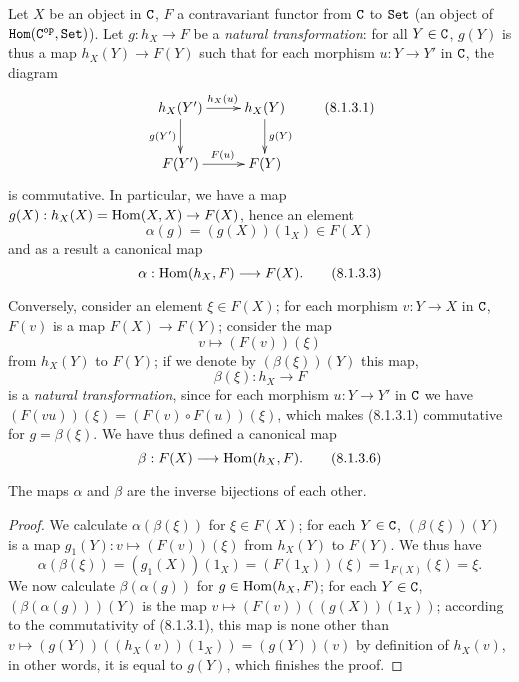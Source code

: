 \begin{env}[8.1.3]
\label{0.8.1.3}
Let $X$ be an object in $\mathtt{C}$, $F$ a contravariant functor from $\mathtt{C}$ to $\mathtt{Set}$
(an object of $\mathtt{Hom}(\mathtt{C}^\mathtt{op},\mathtt{Set})$). Let $g:h_X\to F$ be a \emph{natural transformation}: for all $Y\in\mathtt{C}$,
$g(Y)$ is thus a map $h_X(Y)\to F(Y)$ such that for each morphism $u:Y\to Y'$ in $\mathtt{C}$,
the diagram
\[
  \xymatrix{
    h_X(Y')\ar[r]^{h_X(u)}\ar[d]_{g(Y')} &
    h_X(Y)\ar[d]^{g(Y)}\\
    F(Y')\ar[r]^{F(u)} &
    F(Y)
  }
  \tag{8.1.3.1}
\]
is commutative. In particular, we have a map $g(X):h_X(X)=\Hom(X,X)\to F(X)$, hence an element
\[
  \alpha(g)=(g(X))(1_X)\in F(X)
  \tag{8.1.3.2}
\]
and as a result a canonical map
\[
  \alpha:\Hom(h_X,F)\to F(X).
  \tag{8.1.3.3}
\]

Conversely, consider an element $\xi\in F(X)$; for each morphism $v:Y\to X$ in $\mathtt{C}$, $F(v)$ is a
map $F(X)\to F(Y)$; consider the map
\[
  v\mapsto(F(v))(\xi)
  \tag{8.1.3.4}
\]
from $h_X(Y)$ to $F(Y)$; if we denote by $(\beta(\xi))(Y)$ this map,
\[
  \beta(\xi):h_X\to F
  \tag{8.1.3.5}
\]
is a \emph{natural transformation}, since for each morphism $u:Y\to Y'$ in $\mathtt{C}$ we have
$(F(vu))(\xi)=(F(v)\circ F(u))(\xi)$, which makes (8.1.3.1) commutative for $g=\beta(\xi)$.
We have thus defined a canonical map
\[
  \beta:F(X)\to\Hom(h_X,F).
  \tag{8.1.3.6}
\]
\end{env}

\begin{proposition}[8.1.4]
\label{0.8.1.4}
The maps $\alpha$ and $\beta$ are the inverse bijections of each other.
\end{proposition}

\begin{proof}
We calculate $\alpha(\beta(\xi))$ for $\xi\in F(X)$; for each $Y\in\mathtt{C}$, $(\beta(\xi))(Y)$ is a map
$g_1(Y):v\mapsto(F(v))(\xi)$ from $h_X(Y)$ to $F(Y)$. We thus have
\[
  \alpha(\beta(\xi))=(g_1(X))(1_X)=(F(1_X))(\xi)=1_{F(X)}(\xi)=\xi.
\]
We now calculate $\beta(\alpha(g))$ for $g\in{\mathop{\mathrm{Hom}}\nolimits}(h_X,F)$; for each $Y\in\mathtt{C}$, $(\beta(\alpha(g)))(Y)$
is the map $v\mapsto(F(v))((g(X))(1_X))$; according to the commutativity of (8.1.3.1), this map
is none other than $v\mapsto(g(Y))((h_X(v))(1_X))=(g(Y))(v)$ by definition of $h_X(v)$, in other words,
it is equal to $g(Y)$, which finishes the proof.
\end{proof}

